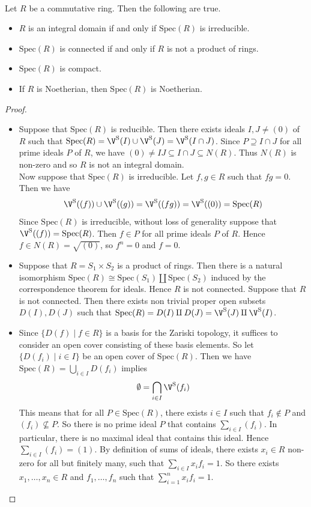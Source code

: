 \documentclass[a4paper]{article}
\begin{document}
\begin{prp}{}{}\\
Let $R$ be a commutative ring. Then the following are true. 
\begin{itemize}
\item $R$ is an integral domain if and only if $\text{Spec}(R)$ is irreducible. 
\item $\text{Spec}(R)$ is connected if and only if $R$ is not a product of rings. 
\item $\text{Spec}(R)$ is compact. 
\item If $R$ is Noetherian, then $\text{Spec}(R)$ is Noetherian. 
\end{itemize}
\begin{proof}\\
\begin{itemize}
\item Suppose that $\text{Spec}(R)$ is reducible. Then there exists ideals $I,J\neq(0)$ of $R$ such that $\text{Spec}(R)=\V^\text{S}(I)\cup\V^\text{S}(J)=\V^\text{S}(I\cap J)$. Since $P\supseteq I\cap J$ for all prime ideals $P$ of $R$, we have $(0)\neq IJ\subseteq I\cap J\subseteq N(R)$. Thus $N(R)$ is non-zero and so $R$ is not an integral domain. \\

Now suppose that $\text{Spec}(R)$ is irreducible. Let $f,g\in R$ such that $fg=0$. Then we have $$\V^\text{S}((f))\cup\V^\text{S}((g))=\V^\text{S}((fg))=\V^\text{S}((0))=\text{Spec}(R)$$ Since $\text{Spec}(R)$ is irreducible, without loss of generality suppose that $\V^\text{S}((f))=\text{Spec}(R)$. Then $f\in P$ for all prime ideals $P$ of $R$. Hence $f\in N(R)=\sqrt{(0)}$, so $f^n=0$ and $f=0$. 
\item Suppose that $R=S_1\times S_2$ is a product of rings. Then there is a natural isomorphism $\text{Spec}(R)\cong\text{Spec}(S_1)\amalg\text{Spec}(S_2)$ induced by the correspondence theorem for ideals. Hence $R$ is not connected. Suppose that $R$ is not connected. Then there exists non trivial proper open subsets $D(I),D(J)$ such that $\text{Spec}(R)=D(I)\amalg D(J)=\V^\text{S}(J)\amalg\V^\text{S}(I)$. 
\item Since $\{D(f)\;|\;f\in R\}$ is a basis for the Zariski topology, it suffices to consider an open cover consisting of these basis elements. So let $\{D(f_i)\;|\;i\in I\}$ be an open cover of $\text{Spec}(R)$. Then we have $\text{Spec}(R)=\bigcup_{i\in I}D(f_i)$ implies $$\emptyset=\bigcap_{i\in I}\V^\text{S}(f_i)$$ This means that for all $P\in\text{Spec}(R)$, there exists $i\in I$ such that $f_i\notin P$ and $(f_i)\not\subseteq P$. So there is no prime ideal $P$ that contains $\sum_{i\in I}(f_i)$. In particular, there is no maximal ideal that contains this ideal. Hence $\sum_{i\in I}(f_i)=(1)$. By definition of sums of ideals, there exists $x_i\in R$ non-zero for all but finitely many, such that $\sum_{i\in I}x_if_i=1$. So there exists $x_1,\dots,x_n\in R$ and $f_1,\dots,f_n$ such that $\sum_{i=1}^nx_if_i=1$. \\


\end{itemize}
\end{proof}
\end{prp}
\end{document}
